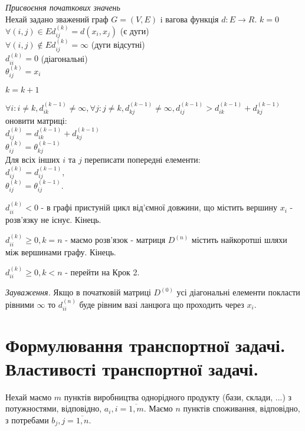 \documentclass[12pt,a4paper]{article}
\newenvironment{slim_enumerate}{
\begin{enumerate}
  \setlength{\itemsep}{1pt}
  \setlength{\parskip}{0pt}
  \setlength{\parsep}{0pt}}
{\end{enumerate}}
\begin{document}
\begin{slim_enumerate}
  \item \emph{Присвоєння початкових значень}\\
Нехай задано зважений граф $G=(V,E)$ i вагова функція $d:E \rightarrow R$.
$k=0$\\
$\forall (i,j) \in E d_{ij}^{(k)}=d(x_i,x_j)$ (є дуги)\\
$\forall (i,j) \notin E d_{ij}^{(k)}=\infty$ (дуги відсутні)\\
$d_{ii}^{(k)}=0$ (діагональні)\\
$\theta_{ij}^{(k)}=x_i$
  \item $k=k+1$
  \item $\forall i: i \neq k, d_{ik}^{(k-1)} \neq \infty, \forall j: j \neq k, d_{kj}^{(k-1)} \neq \infty, d_{ij}^{(k-1)}>d_{ik}^{(k-1)}+d_{kj}^{(k-1)}$ оновити матриці:\\
$d_{ij}^{(k)}=d_{ik}^{(k-1)}+d_{kj}^{(k-1)}$\\
$\theta_{ij}^{(k)}=\theta_{kj}^{(k-1)}$\\
Для всіх інших $i$ та $j$ переписати попередні елементи:\\
$d_{ij}^{(k)}=d_{ij}^{(k-1)}$,\\
$\theta_{ij}^{(k)}=\theta_{ij}^{(k-1)}$.
  \item 
    \begin{slim_enumerate}
      \item $d_{ii}^{(k)} < 0$ - в графі пристуній цикл від’ємної довжини, що містить вершину $x_i$ - розв’язку не існує. Кінець.
      \item $d_{ii}^{(k)} \geq 0, k=n$ - маємо розв’язок - матриця $D^{(n)}$ містить найкоротші шляхи між вершинами графу. Кінець.
      \item $d_{ii}^{(k)} \geq 0, k<n$ - перейти на Крок 2.
    \end{slim_enumerate}
\end{slim_enumerate}

\emph{Зауваження.} Якщо в початковій матриці $D^{(0)}$ усі діагональні елементи покласти рівними $\infty$ то $d_{ii}^{(n)}$ буде рівним вазі ланцюга що проходить через $x_i$.

\clearpage

\section{Формулювання транспортної задачі. Властивості транспортної задачі.}

Нехай маємо $m$ пунктів виробництва однорідного продукту (бази, склади, ...) з потужностями, відповідно, $a_i, i = \overline{1, m}$. Маємо $n$ пунктів споживання, відповідно, з потребами $b_j, j =\overline{1, n}$.
\end{document}
